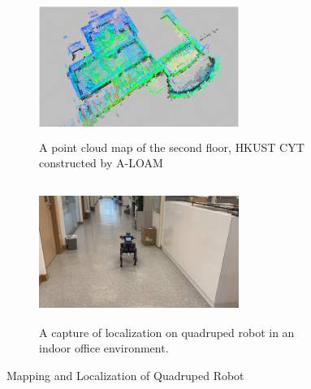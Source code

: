  \begin{figure}[!ht]
    \centering
    \begin{subfigure}{0.45\textwidth}
        \centering
        \includegraphics[width=6.5cm, height=4.5cm]{figure/pqe/pointcloudmap.png}
        \caption{A point cloud map of the second floor, HKUST CYT constructed by A-LOAM}
    \end{subfigure}
    \centering
    \begin{subfigure}{0.45\textwidth}
        \centering
        \includegraphics[width=6.5cm, height=4.5cm]{figure/pqe/quadruped.png}
        \caption{A capture of localization on quadruped robot in an indoor office environment.}
    \end{subfigure}
    \caption{Mapping and Localization of Quadruped Robot}
    \label{fig:quadruped}
 \end{figure}

